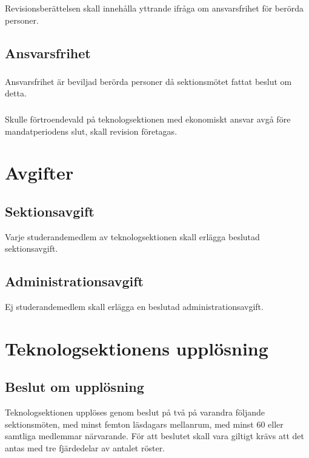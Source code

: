 \documentclass[a4paper]{dtek}
\begin{document}
\subsubsection{}
Revisionsberättelsen skall innehålla yttrande ifråga om ansvarsfrihet för berörda personer.
\subsection{Ansvarsfrihet}
\subsubsection{}
Ansvarsfrihet är beviljad berörda personer då sektionsmötet fattat beslut om detta.
\subsubsection{}
Skulle förtroendevald på teknologsektionen med ekonomiskt ansvar avgå före mandatperiodens slut, skall revision företagas.
\newpage

\section{Avgifter}
\subsection{Sektionsavgift}
Varje studerandemedlem av teknologsektionen skall erlägga beslutad sektionsavgift.
\subsection{Administrationsavgift}
Ej studerandemedlem skall erlägga en beslutad administrationsavgift.
\newpage

\section{Teknologsektionens upplösning}
\subsection{Beslut om upplösning}
Teknologsektionen upplöses genom beslut på två på varandra följande sektionsmöten, med minst femton läsdagars mellanrum, med minst 60 eller samtliga medlemmar närvarande. För att beslutet skall vara giltigt krävs att det antas med tre fjärdedelar av antalet röster.
\end{document}
